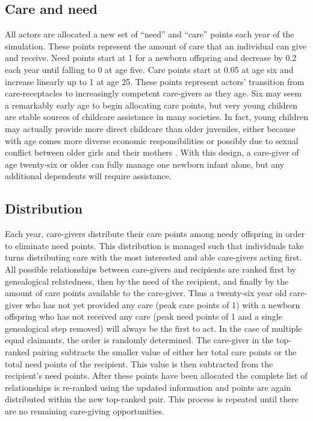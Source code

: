 \subsection{Care and need}
\label{sec:1a}
All actors are allocated a new set of ``need'' and ``care'' points each year of the simulation.  These points represent the amount of care that an individual can give and receive.  Need points start at 1 for a newborn offspring and decrease by 0.2 each year until falling to 0 at age five.  Care points start at 0.05 at age six and increase linearly up to 1 at age 25.  These points represent actors' transition from care-receptacles to increasingly competent care-givers as they age.  Six may seem a remarkably early age to begin allocating care points, but very young children are stable sources of childcare assistance in many societies.  In fact, young children may actually provide more direct childcare than older juveniles, either because with age comes more diverse economic responsibilities or possibly due to sexual conflict between older girls and their mothers \cite{kramer2009does, flinn1989household}.  With this design, a care-giver of age twenty-six or older can fully manage one newborn infant alone, but any additional dependents will require assistance.

\subsection{Distribution}
\label{sec:1b}
Each year, care-givers distribute their care points among needy offspring in order to eliminate need points.  This distribution is managed such that individuals take turns distributing care with the most interested and able care-givers acting first.  All possible relationships between care-givers and recipients are ranked first by genealogical relatedness, then by the need of the recipient, and finally by the amount of care points available to the care-giver.  Thus a twenty-six year old care-giver who has not yet provided any care (peak care points of 1) with a newborn offspring who has not received any care (peak need points of 1 and a single genealogical step removed) will always be the first to act.  In the case of multiple equal claimants, the order is randomly determined.  The care-giver in the top-ranked pairing subtracts the smaller value of either her total care points or the total need points of the recipient.  This value is then subtracted from the recipient's need points.  After these points have been allocated the complete list of relationships is re-ranked using the updated information and points are again distributed within the new top-ranked pair.  This process is repeated until there are no remaining care-giving opportunities.

